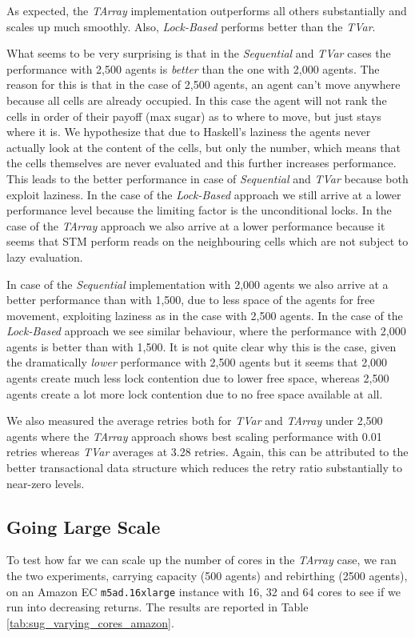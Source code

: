 As expected, the \textit{TArray} implementation outperforms all others substantially and scales up much smoothly. Also, \textit{Lock-Based} performs better than the \textit{TVar}.

What seems to be very surprising is that in the \textit{Sequential} and \textit{TVar} cases the performance with 2,500 agents is \textit{better} than the one with 2,000 agents. The reason for this is that in the case of 2,500 agents, an agent can't move anywhere because all cells are already occupied. In this case the agent will not rank the cells in order of their payoff (max sugar) as to where to move, but just stays where it is. We hypothesize that due to Haskell's laziness the agents never actually look at the content of the cells, but only the number, which means that the cells themselves are never evaluated and this further increases performance. This leads to the better performance in case of \textit{Sequential} and \textit{TVar} because both exploit laziness. 
In the case of the \textit{Lock-Based} approach we still arrive at a lower performance level because the limiting factor is the unconditional locks. In the case of the \textit{TArray} approach we also arrive at a lower performance because it seems that STM perform reads on the neighbouring cells which are not subject to lazy evaluation.

In case of the \textit{Sequential} implementation with 2,000 agents we also arrive at a better performance than with 1,500, due to less space of the agents for free movement, exploiting laziness as in the case with 2,500 agents. In the case of the \textit{Lock-Based} approach we see similar behaviour, where the performance with 2,000 agents is better than with 1,500. It is not quite clear why this is the case, given the dramatically \textit{lower} performance with 2,500 agents but it seems that 2,000 agents create much less lock contention due to lower free space, whereas 2,500 agents create a lot more lock contention due to no free space available at all.

We also measured the average retries both for \textit{TVar} and \textit{TArray} under 2,500 agents where the \textit{TArray} approach shows best scaling performance with 0.01 retries whereas \textit{TVar} averages at 3.28 retries. Again, this can be attributed to the better transactional data structure which reduces the retry ratio substantially to near-zero levels.

\subsection{Going Large Scale}
To test how far we can scale up the number of cores in the \textit{TArray} case, we ran the two experiments, carrying capacity (500 agents) and rebirthing (2500 agents), on an Amazon EC \texttt{m5ad.16xlarge} instance with 16, 32 and 64 cores to see if we run into decreasing returns. The results are reported in Table \ref{tab:sug_varying_cores_amazon}.

